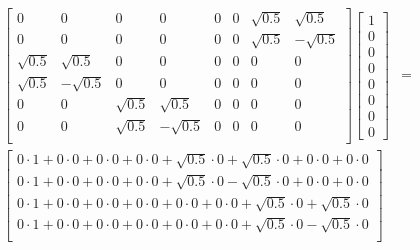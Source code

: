 \begin{figure}[H]
\begin{align*}
\begin{bmatrix}
        0           &  0          &   0          &   0          &   0               &          0          &   \sqrt{0.5} &   \sqrt{0.5}\\
        0           &  0          &   0          &   0          &   0               &          0          &   \sqrt{0.5} &  -\sqrt{0.5}\\
        \sqrt{0.5}  &  \sqrt{0.5} &   0          &   0          &   0               &          0          &   0          &   0         \\
        \sqrt{0.5}  & -\sqrt{0.5} &   0          &   0          &   0               &          0          &   0          &   0         \\
        0           &  0          &   \sqrt{0.5} &   \sqrt{0.5} &   0               &          0          &   0          &   0         \\
        0           &  0          &   \sqrt{0.5} &  -\sqrt{0.5} &   0               &          0          &   0          &   0         \\
        \end{bmatrix}
        \begin{bmatrix}
            1\\
            0\\
            0\\
            0\\
            0\\
            0\\
            0\\
            0
        \end{bmatrix}
        &=\\
        \begin{bmatrix}
            0           \cdot 1 +  0          \cdot 0 +   0          \cdot 0 +   0          \cdot 0 +   \sqrt{0.5}      \cdot 0 +          \sqrt{0.5} \cdot 0 +   0          \cdot 0 +   0         \cdot 0\\
            0           \cdot 1 +  0          \cdot 0 +   0          \cdot 0 +   0          \cdot 0 +   \sqrt{0.5}      \cdot 0           -\sqrt{0.5} \cdot 0 +   0          \cdot 0 +   0         \cdot 0\\
            0           \cdot 1 +  0          \cdot 0 +   0          \cdot 0 +   0          \cdot 0 +   0               \cdot 0 +          0          \cdot 0 +   \sqrt{0.5} \cdot 0 +   \sqrt{0.5}\cdot 0\\
            0           \cdot 1 +  0          \cdot 0 +   0          \cdot 0 +   0          \cdot 0 +   0               \cdot 0 +          0          \cdot 0 +   \sqrt{0.5} \cdot 0    -\sqrt{0.5}\cdot 0\\

\end{bmatrix}
\end{align*}
\end{figure}
